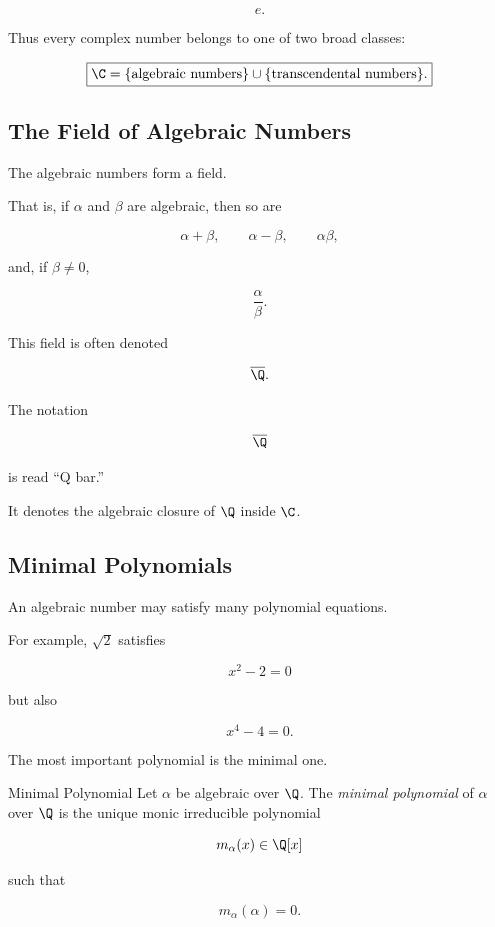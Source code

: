\[ e. \]

Thus every complex number belongs to one of two broad classes:

\[
\boxed{
\C
=
\{\text{algebraic numbers}\}
\cup
\{\text{transcendental numbers}\}.
}
\]

\subsection{The Field of Algebraic Numbers}
\label{subsec:field-algebraic-numbers}

The algebraic numbers form a field.

That is, if \(\alpha\) and \(\beta\) are algebraic, then so are

\[ \alpha+\beta,\qquad\alpha-\beta,\qquad\alpha\beta, \]

and, if \(\beta\neq0\),

\[ \frac{\alpha}{\beta}. \]

This field is often denoted

\[ \overline{\Q}. \]

The notation

\[ \overline{\Q} \]

is read ``Q bar.''

It denotes the algebraic closure of \(\Q\) inside \(\C\).

\subsection{Minimal Polynomials}
\label{subsec:minimal-polynomials-number-theory}

An algebraic number may satisfy many polynomial equations.

For example, \(\sqrt2\) satisfies

\[ x^2-2=0 \]

but also

\[ x^4-4=0. \]

The most important polynomial is the minimal one.

\begin{definitionbox}{Minimal Polynomial}
Let \(\alpha\) be algebraic over \(\Q\). The \emph{minimal polynomial} of
\(\alpha\) over \(\Q\) is the unique monic irreducible polynomial

\[ m_\alpha(x)\in\Q[x] \]

such that

\[ m_\alpha(\alpha)=0. \]
\end{definitionbox}

